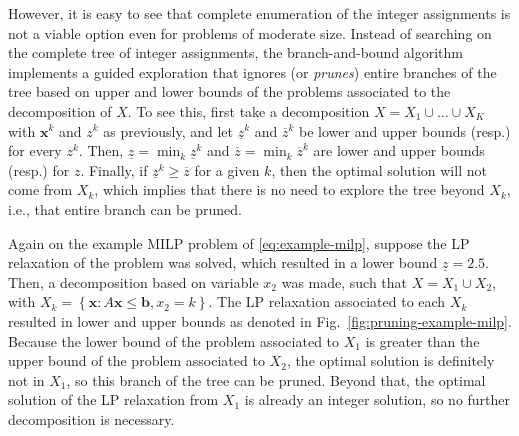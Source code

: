 However, it is easy to see that complete enumeration of the integer assignments is not a viable option even for problems of moderate size.
Instead of searching on the complete tree of integer assignments, the branch-and-bound algorithm implements a guided exploration that ignores (or \emph{prunes}) entire branches of the tree based on upper and lower bounds of the problems associated to the decomposition of $X$.
To see this, first take a decomposition  $X=X_1\cup \ldots\cup X_K$ with $\bm{x}^k$ and $z^k$ as previously, and let $\underline{z}^{k}$ and $\overline{z}^{k}$ be lower and upper bounds (resp.) for every $z^{k}$.
Then, $\underline{z}=\min_k \underline{z}^{k}$ and $\overline{z}=\min_k \overline{z}^{k}$ are lower and upper bounds (resp.) for $z$.
Finally, if $\underline{z}^{k} \ge \overline{z}$ for a given $k$, then the optimal solution will not come from $X_k$, which implies that there is no need to explore the tree beyond $X_k$, i.e., that entire branch can be pruned. 

Again on the example MILP problem of \eqref{eq:example-milp}, suppose the LP relaxation of the problem was solved, which resulted in a lower bound $\underline{z}=2.5$.
Then, a decomposition based on variable $x_2$ was made, such that $X=X_1\cup X_2$, with $X_k = \left\{ \bm{x} : A\bm{x}\le \bm{b}, x_2 = k \right\}$.
The LP relaxation associated to each $X_k$ resulted in lower and upper bounds as denoted in Fig.~\ref{fig:pruning-example-milp}.
Because the lower bound of the problem associated to $X_1$ is greater than the upper bound of the problem associated to $X_2$, the optimal solution is definitely not in $X_1$, so this branch of the tree can be pruned.
Beyond that, the optimal solution of the LP relaxation from $X_1$ is already an integer solution, so no further decomposition is necessary. 

